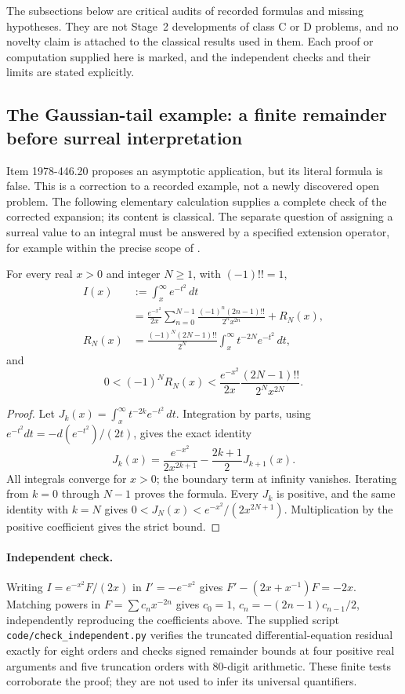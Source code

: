 The subsections below are critical audits of recorded formulas and missing hypotheses. They are not Stage~2 developments of class C or D problems, and no novelty claim is attached to the classical results used in them. Each proof or computation supplied here is marked, and the independent checks and their limits are stated explicitly.

\subsection{The Gaussian-tail example: a finite remainder before surreal interpretation}
\label{audit:gaussian}
Item 1978-446.20 proposes an asymptotic application, but its literal formula is false. This is a correction to a recorded example, not a newly discovered open problem. The following elementary calculation supplies a complete check of the corrected expansion; its content is classical. The separate question of assigning a surreal value to an integral must be answered by a specified extension operator, for example within the precise scope of \citet[Thms.~78 and 85]{costinehrlich2024integration}.

\begin{proposition}\ours{}
For every real \(x>0\) and integer \(N\ge1\), with \((-1)!!=1\),
\begin{align*}
I(x)&:=\int_x^\infty e^{-t^2}\,dt\\
&=\frac{e^{-x^2}}{2x}\sum_{n=0}^{N-1}
 \frac{(-1)^n(2n-1)!!}{2^n x^{2n}}+R_N(x),\\
R_N(x)&=\frac{(-1)^N(2N-1)!!}{2^N}
       \int_x^\infty t^{-2N}e^{-t^2}\,dt,
\end{align*}
and
\[
0<(-1)^N R_N(x)<
\frac{e^{-x^2}}{2x}\frac{(2N-1)!!}{2^N x^{2N}}.
\]
\end{proposition}
\begin{proof}
Let \(J_k(x)=\int_x^\infty t^{-2k}e^{-t^2}\,dt\). Integration by parts, using
\(e^{-t^2}dt=-d(e^{-t^2})/(2t)\), gives the exact identity
\[
J_k(x)=\frac{e^{-x^2}}{2x^{2k+1}}-\frac{2k+1}{2}J_{k+1}(x).
\]
All integrals converge for \(x>0\); the boundary term at infinity vanishes. Iterating from \(k=0\) through \(N-1\) proves the formula. Every \(J_k\) is positive, and the same identity with \(k=N\) gives
\(0<J_N(x)<e^{-x^2}/(2x^{2N+1})\). Multiplication by the positive coefficient gives the strict bound.
\end{proof}

\paragraph{Independent check.}
Writing \(I=e^{-x^2}F/(2x)\) in \(I'=-e^{-x^2}\) gives
\(F'-(2x+x^{-1})F=-2x\). Matching powers in \(F=\sum c_nx^{-2n}\) gives
\(c_0=1\), \(c_n=-(2n-1)c_{n-1}/2\), independently reproducing the coefficients above. The supplied script \texttt{code/check\_independent.py} verifies the truncated differential-equation residual exactly for eight orders and checks signed remainder bounds at four positive real arguments and five truncation orders with 80-digit arithmetic. These finite tests corroborate the proof; they are not used to infer its universal quantifiers.

